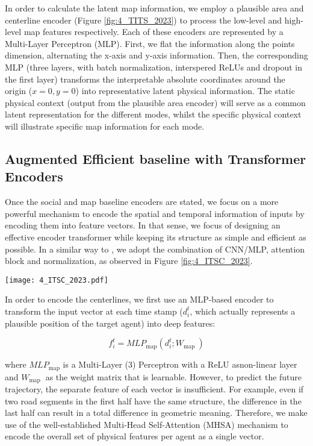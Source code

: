 In order to calculate the latent map information, we employ a plausible area and centerline encoder (Figure \ref{fig:4_TITS_2023}) to process the low-level and high-level map features respectively. Each of these encoders are represented by a Multi-Layer Perceptron (MLP). First, we flat the information along the points dimension, alternating the x-axis and y-axis information. Then, the corresponding MLP (three layers, with batch normalization, interspered ReLUs and dropout in the first layer) transforms the interpretable absolute coordinates around the origin ($x=0, y=0$) into representative latent physical information. The static physical context (output from the plausible area encoder) will serve as a common latent representation for the different modes, whilst the specific physical context will illustrate specific map information for each mode.

\subsection{Augmented Efficient baseline with Transformer Encoders}
\label{subsec:4_augmented_baseline}

Once the social and map baseline encoders are stated, we focus on a more powerful mechanism to encode the spatial and temporal information of inputs by encoding them into feature vectors. In that sense, we focus of designing an effective encoder transformer while keeping its structure as simple and efficient as possible. In a similar way to \cite{wang2023lane}, we adopt the combination of CNN/MLP, attention block and normalization, as observed in Figure \ref{fig:4_ITSC_2023}.

\begin{figure*}[!ht]
	\centering
	\setlength{\tabcolsep}{2.0pt}
	\texttt{[image: 4\_ITSC\_2023.pdf]}
	\caption{Efficient baseline with transformer encoders to process the physical and social input}	
	\label{fig:4_ITSC_2023}
\end{figure*}

In order to encode the centerlines, we first use an MLP-based encoder to transform the input vector at each time stamp ($d_i^t$, which actually represents a plausible position of the target agent) into deep features:

\begin{equation}
	f_i^t=MLP_{\text{map}}\left(d_i^t ; W_{\text {map }}\right)
\end{equation}

where $MLP_{\text{map}}$ is a Multi-Layer (3) Perceptron with a ReLU asnon-linear layer and $W_{\text {map }}$ as the weight matrix that is learnable. However, to predict the future trajectory, the separate feature of each vector is insufficient. For example, even if two road segments in the first half have the same structure, the difference in the last half can result in a total difference in geometric meaning. Therefore, we make use of the well-established Multi-Head Self-Attention (MHSA) \cite{vaswani2017attention} mechanism to encode the overall set of physical features per agent as a single vector.

